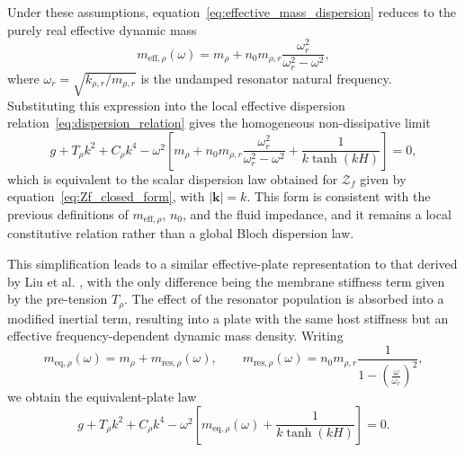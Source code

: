 Under these assumptions, equation~\eqref{eq:effective_mass_dispersion} reduces to the purely real effective dynamic mass
\begin{equation}
    m_{\mathrm{eff},\rho}(\omega)
    = m_\rho + n_0 m_{\rho,r}\frac{\omega_r^2}{\omega_r^2-\omega^2},
\end{equation}
where $\omega_r = \sqrt{k_{\rho,r}/m_{\rho,r}}$ is the undamped resonator natural frequency. Substituting this expression into the local effective dispersion relation~\eqref{eq:dispersion_relation} gives the homogeneous non-dissipative limit
\begin{equation}
    g + T_\rho k^2 + C_\rho k^4
    - \omega^2\left[m_\rho + n_0 m_{\rho,r}\frac{\omega_r^2}{\omega_r^2-\omega^2} + \frac{1}{k\tanh(kH)}\right]=0,
\end{equation}
which is equivalent to the scalar dispersion law obtained for $\mathcal{Z}_f$ given by equation~\eqref{eq:Zf_closed_form}, with $|\mathbf{k}|=k$. This form is consistent with the previous definitions of $m_{\mathrm{eff},\rho}$, $n_0$, and the fluid impedance, and it remains a local constitutive relation rather than a global Bloch dispersion law.

This simplification leads to a similar effective-plate representation to that derived by Liu et al. \citep[eq.~(3.4)]{liu2025metaplate}, with the only difference being the membrane stiffness term given by the pre-tension $T_\rho$. 
The effect of the resonator population is absorbed into a modified inertial term, resulting into a plate with the same host stiffness but an effective frequency-dependent dynamic mass density. Writing
\begin{equation}
    m_{\mathrm{eq},\rho}(\omega)
    = m_\rho + m_{\mathrm{res},\rho}(\omega),
    \qquad
    m_{\mathrm{res},\rho}(\omega)
    = n_0 m_{\rho,r}\frac{1}{1-\left(\frac{\omega}{\omega_r}\right)^2},
\end{equation}
we obtain the equivalent-plate law
\begin{equation}\label{eq:equivalent_isotropic_plate_dispersion}
    g + T_\rho k^2 + C_\rho k^4
    - \omega^2\left[m_{\mathrm{eq},\rho}(\omega)+\frac{1}{k\tanh(kH)}\right]=0.
\end{equation}

